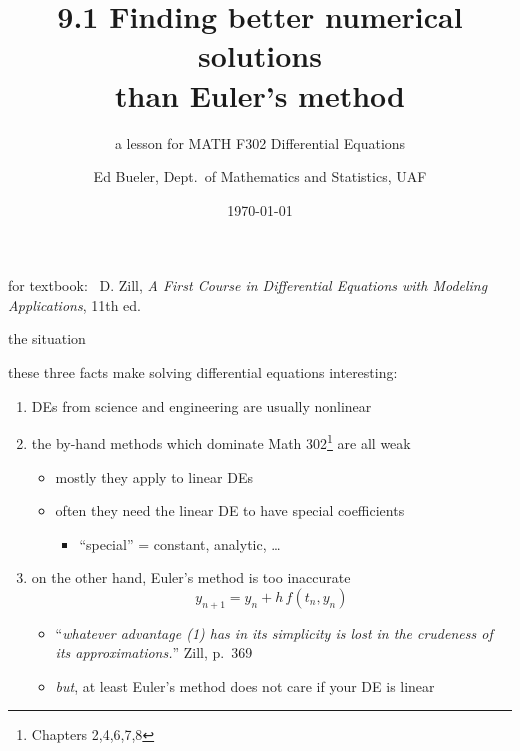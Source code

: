 \documentclass[urlcolor=blue,dvipsnames]{beamer}
\title{9.1 Finding better numerical solutions \\ than Euler's method}
\subtitle{a lesson for MATH F302 Differential Equations}
\author{Ed Bueler, Dept.~of Mathematics and Statistics, UAF}
\date{\tiny \today}
\begin{document}
\renewcommand{\thefootnote}{{\color{green} \arabic{footnote}}}

\begin{frame}
\titlepage

\centerline{\tiny for textbook: \, D. Zill, \emph{A First Course in Differential Equations with Modeling Applications}, 11th ed.}
\end{frame}


\begin{frame}{the situation}

these three facts make solving differential equations interesting:
\begin{enumerate}
\item \alert{DEs} from science and engineering are usually \alert{nonlinear}
\item the \alert{by-hand methods} which dominate Math 302\footnote{Chapters 2,4,6,7,8} are all \alert{weak}
    \begin{itemize}
    \item mostly they apply to linear DEs
    \item often they need the linear DE to have special coefficients
        \begin{itemize}
        \item ``special'' = constant, analytic, \dots
        \end{itemize}
    \end{itemize}
\item on the other hand, \alert{Euler's method} is too \alert{inaccurate}
\begin{equation}
    y_{n+1} = y_n + h\, f(t_n,y_n)
\end{equation}

\vspace{-2mm}
    \begin{itemize}
    \item ``\emph{whatever advantage {\normalfont (1)} has in its simplicity is lost in the crudeness of its approximations.}'' \hfill Zill, p.~369
    \item \emph{but}, at least Euler's method does not care if your DE is linear
    \end{itemize}
\end{enumerate}
\end{frame}
\end{document}
